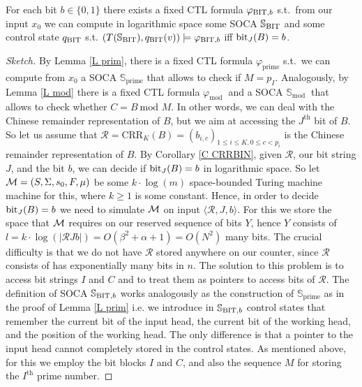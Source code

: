 \documentclass[times,envcountsame]{llncs}
\newcommand{\prim}{\text{prime}}
\renewcommand{\mod}{\text{mod }}
\def\CRR{{\mathrm{CRR}}}
\newcommand{\Soca}{\mathbb{S}}
\begin{document}
\begin{lemma}{\label{L BIT}}
For each bit $b\in\{0,1\}$ there exists a fixed CTL formula
$\varphi_{\text{BIT},b}$ s.t.\ from our input $x_0$ we can compute in
logarithmic space some SOCA $\Soca_{\BIT}$ and some control state
$q_{\text{BIT}}$ s.t. $(T(\Soca_\BIT),q_\BIT(v))\models\varphi_{\BIT,b}$ iff
$\text{bit}_J(B)=b$.
\end{lemma}
\renewcommand{\C}{\mathcal{C}}
\renewcommand{\R}{\mathcal{R}}
\begin{proof}[Sketch]
By Lemma \ref{L prim}, there is a fixed CTL
formula $\varphi_\prim$ s.t.\ we can compute from $x_0$ a
SOCA $\Soca_\prim$ that allows to check if $M=p_I$.
Analogously, by Lemma \ref{L mod} there is a fixed CTL
formula $\varphi_\mod$ and a SOCA $\Soca_\mod$ that allows
to check whether $C=B\ \mod M$.
In other words, we can deal with the Chinese remainder representation
of $B$, but we aim at accessing the $J^{\text{th}}$ bit of $B$.
So let us assume that $\R=\CRR_{K}(B)=(b_{i,c})_{1\leq i\leq K,0\leq c<p_i}$
is the Chinese remainder representation of $B$.
By Corollary \ref{C CRRBIN}, given $\R$, our
bit string $J$, and the bit $b$,
we can decide if $\text{bit}_J(B)=b$ in logarithmic space.
So let $\mathcal{M}=(S,\Sigma,s_0,F,\mu)$ be some $k\cdot\log(m)$ space-bounded
Turing machine machine for this, where $k\geq 1$ is some constant.
Hence, in order to decide
$\text{bit}_J(B)=b$ we need to simulate $\mathcal{M}$ on input $\langle \R, J, b\rangle$.
For this we store the space that $\mathcal{M}$ requires on our reserved
sequence of bits $Y$, hence $Y$ consists of
$l=k\cdot\log(|\R Jb|)=O(\beta^2+\alpha+1)=O(N^2)$ many bits.
The crucial difficulty is that we do not have $\R$ stored anywhere on our
counter, since $\R$ consists of has exponentially many bits in $n$.
The solution to this problem is to access bit strings $I$ and $C$
and to treat them as pointers to access bits of $\R$.
The definition of SOCA $\Soca_{\BIT,b}$ works analogously as the construction
of $\Soca_{\prim}$ as in the proof of Lemma \ref{L prim}
i.e. we introduce in $\Soca_{\BIT,b}$ control states
that remember the current bit of the input head, the current bit of
the working head, and the position of the working head.
The only difference is that a pointer to the input head cannot completely stored
in the control states.
As mentioned above, for this we employ the bit blocks $I$ and $C$,
and also the sequence $M$ for storing the $I^{\text{th}}$ prime number.

\end{proof}
\end{document}
